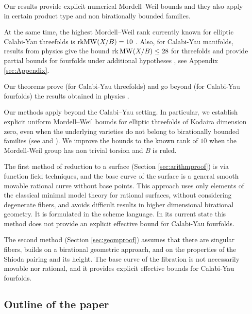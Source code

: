 \documentclass[11pt]{amsart}
\theoremstyle{definition}
\theoremstyle{definition}
\theoremstyle{remark}
\theoremstyle{remark}
\theoremstyle{definition}
\theoremstyle{conjecture}
\newcommand{\MW}{\mathrm{MW}}
\begin{document}
 Our  results  provide explicit numerical Mordell{--}Weil bounds and they also apply in certain product type and non birationally bounded families.



 
 At the same time, the highest Mordell{--}Weil rank currently known for elliptic Calabi-Yau threefolds is ${\rm rk}\MW(X/B) = 10$ 
 \cite{Grassi:2021wii,Elkies}. Also, for  Calabi-Yau manifolds, results from physics give the bound $\mathrm{rk}\,{\rm MW} (X/B)\le 28$ for threefolds and provide partial bounds for fourfolds under additional hypotheses \cite{Lee:2019skh,Martucci:2022krl,Lee:2022swr}, see Appendix \ref{sec:Appendix}.
 

 
Our theorems  prove (for Calabi-Yau threefolds)  and go beyond (for Calabi-Yau fourfolds) the  results obtained in  physics  \cite{Lee:2019skh,Martucci:2022krl,Lee:2022swr}.




Our methods apply beyond the Calabi{--}Yau setting. In particular, we establish explicit uniform Mordell{--}Weil bounds for elliptic threefolds of Kodaira dimension zero, even when the underlying varieties do not belong to birationally bounded families (see \cite{DiCerboSvaldi} and \cite{Birkar_2024}).
We improve the bounds to the known rank of $10$ when the Mordell-Weil group has non trivial torsion and $B$ is ruled.


  
The first method  of reduction to a surface (Section \ref{sec:arithmproof}) is via function field techniques,  and the base curve of the surface is a  general smooth movable rational curve without base points. This approach uses only elements of the classical minimal model theory for rational surfaces, without
considering degenerate fibers, and avoids difficult results in higher dimensional birational geometry. It is formulated in the scheme language. In its current state this method does not provide an explicit effective bound for Calabi-Yau fourfolds.

The second  method (Section \ref{sec:geomproof}) assumes that there are singular fibers, builds on a birational geometric approach, and  on the properties of the Shioda pairing and its height. The base curve of the fibration is not necessarily movable nor rational, and it provides  explicit effective bounds for  Calabi-Yau fourfolds.

 

\subsection{Outline of the  paper}
 
\end{document}

